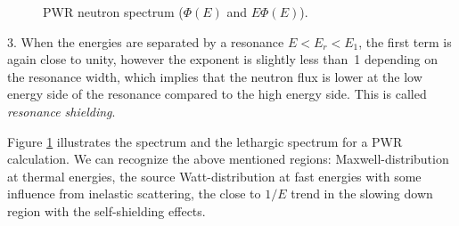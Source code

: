 \begin{figure}[ht!]
\protect {}\protect
\caption{\label{fig:realneutronspectrum} \footnotesize{PWR neutron spectrum ($\Phi(E)$ and $E\Phi(E)$).}}
\end{figure}

3. When the energies are separated by a resonance $E<E_r<E_1$, the first term is again close to unity, however the exponent is slightly less than~1 depending on the resonance width, which implies that the neutron flux is lower at the low energy side of the resonance compared to the high energy side. This is called \textit{resonance shielding}.

Figure \ref{fig:realneutronspectrum} illustrates the spectrum and the lethargic spectrum for a PWR calculation. We can recognize the above mentioned regions: Maxwell-distribution at thermal energies, the source Watt-distribution at fast energies with some influence from inelastic scattering, the close to $1/E$ trend in the slowing down region with the self-shielding effects.

